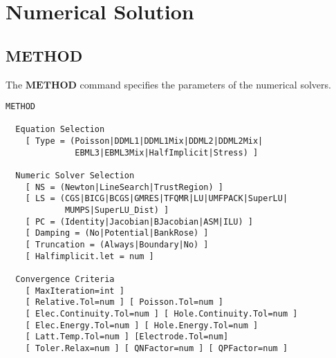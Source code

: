 \documentclass[oneside,12pt]{cgd_book}
\begin{document}
\section{Numerical Solution}
\par
\subsection{METHOD}
The $\mathbf{METHOD}$
command specifies the parameters of the numerical solvers.
\par
\begin{lstlisting}[style=GeniusCmd]
METHOD

  Equation Selection
    [ Type = (Poisson|DDML1|DDML1Mix|DDML2|DDML2Mix|
              EBML3|EBML3Mix|HalfImplicit|Stress) ]

  Numeric Solver Selection
    [ NS = (Newton|LineSearch|TrustRegion) ]
    [ LS = (CGS|BICG|BCGS|GMRES|TFQMR|LU|UMFPACK|SuperLU|
            MUMPS|SuperLU_Dist) ]
    [ PC = (Identity|Jacobian|BJacobian|ASM|ILU) ]
    [ Damping = (No|Potential|BankRose) ]
    [ Truncation = (Always|Boundary|No) ]
    [ Halfimplicit.let = num ]

  Convergence Criteria
    [ MaxIteration=int ]
    [ Relative.Tol=num ] [ Poisson.Tol=num ]
    [ Elec.Continuity.Tol=num ] [ Hole.Continuity.Tol=num ]
    [ Elec.Energy.Tol=num ] [ Hole.Energy.Tol=num ]
    [ Latt.Temp.Tol=num ] [Electrode.Tol=num]
    [ Toler.Relax=num ] [ QNFactor=num ] [ QPFactor=num ]
\end{lstlisting}
\end{document}
